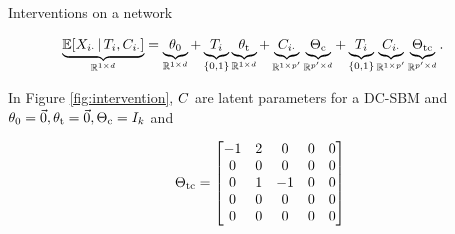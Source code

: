 \documentclass{beamer}
\theoremstyle{remark}
\begin{document}
\begin{frame}{Interventions on a network}

    \begin{align*}
        \underbrace{\E[T_i, \C_{i \cdot}]{\X_{i \cdot}}}_{\R^{1 \times d}}
         & = \underbrace{\thetazero}_{\R^{1 \times d}}
        + \underbrace{T_i}_{\{0, 1\}} \underbrace{\thetat}_{\R^{1 \times d}}
        + \underbrace{\C_{i \cdot}}_{\R^{1 \times p'}} \underbrace{\Thetac}_{\R^{p' \times d}}
        + \underbrace{T_i}_{\{0, 1\}} \underbrace{\C_{i \cdot}}_{\R^{1 \times p'}} \underbrace{\Thetatc}_{\R^{p' \times d}}.
    \end{align*}

    In Figure \ref{fig:intervention}, $C$ are latent parameters for a DC-SBM and $\theta_0 = \vec 0, \theta_\text{t} = \vec 0, \Theta_\text{c} = I_k$ and

    \begin{align*}
        \Theta_\text{tc} =
        \begin{bmatrix}
            -1 & 2 & 0  & 0 & 0 \\
            0  & 0 & 0  & 0 & 0 \\
            0  & 1 & -1 & 0 & 0 \\
            0  & 0 & 0  & 0 & 0 \\
            0  & 0 & 0  & 0 & 0 \\
        \end{bmatrix}
    \end{align*}
\end{frame}



\end{document}
